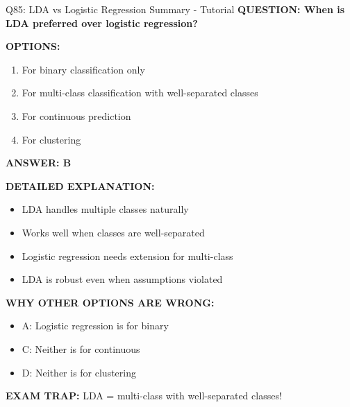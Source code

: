 \documentclass[8pt]{beamer}
\begin{document}
	\begin{frame}{Q85: LDA vs Logistic Regression Summary - Tutorial}
		\fontsize{6.5}{7.5}\selectfont
		\textbf{QUESTION: When is LDA preferred over logistic regression?}
		
		\vspace{0.1cm}
		\textbf{OPTIONS:}
		\begin{enumerate}
			\item For binary classification only
			\item For multi-class classification with well-separated classes
			\item For continuous prediction
			\item For clustering
		\end{enumerate}
		
		\vspace{0.1cm}
		\textcolor{myblue}{\textbf{ANSWER: B}}
		
		\vspace{0.1cm}
		\textbf{DETAILED EXPLANATION:}
		\begin{itemize}
			\item LDA handles multiple classes naturally
			\item Works well when classes are well-separated
			\item Logistic regression needs extension for multi-class
			\item LDA is robust even when assumptions violated
		\end{itemize}
		
		\vspace{0.1cm}
		\textcolor{myred}{\textbf{WHY OTHER OPTIONS ARE WRONG:}}
		\begin{itemize}
			\item \textcolor{myred}{A:} Logistic regression is for binary
			\item \textcolor{myred}{C:} Neither is for continuous
			\item \textcolor{myred}{D:} Neither is for clustering
		\end{itemize}
		
		\textcolor{myred}{\textbf{EXAM TRAP:}} LDA = \textcolor{myblue}{multi-class with well-separated classes}!
	\end{frame}
	
	
\end{document}
